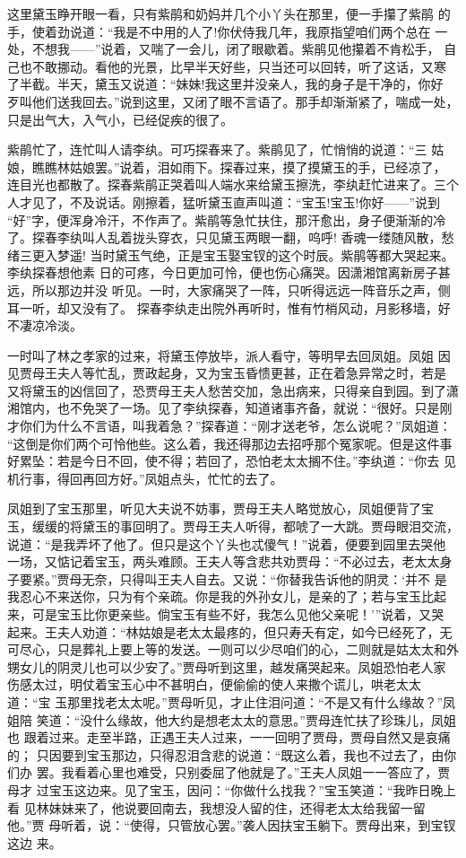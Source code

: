 这里黛玉睁开眼一看，只有紫鹃和奶妈并几个小丫头在那里，便一手攥了紫鹃
的手，使着劲说道：“我是不中用的人了!你伏侍我几年，我原指望咱们两个总在
一处，不想我——”说着，又喘了一会儿，闭了眼歇着。紫鹃见他攥着不肯松手，
自己也不敢挪动。看他的光景，比早半天好些，只当还可以回转，听了这话，又寒
了半截。半天，黛玉又说道：“妹妹!我这里并没亲人，我的身子是干净的，你好
歹叫他们送我回去。”说到这里，又闭了眼不言语了。那手却渐渐紧了，喘成一处，
只是出气大，入气小，已经促疾的很了。

紫鹃忙了，连忙叫人请李纨。可巧探春来了。紫鹃见了，忙悄悄的说道：“三
姑娘，瞧瞧林姑娘罢。”说着，泪如雨下。探春过来，摸了摸黛玉的手，已经凉了，
连目光也都散了。探春紫鹃正哭着叫人端水来给黛玉擦洗，李纨赶忙进来了。三个
人才见了，不及说话。刚擦着，猛听黛玉直声叫道：“宝玉!宝玉!你好——”说到
“好”字，便浑身冷汗，不作声了。紫鹃等急忙扶住，那汗愈出，身子便渐渐的冷
了。探春李纨叫人乱着拢头穿衣，只见黛玉两眼一翻，呜呼!
香魂一缕随风散，愁绪三更入梦遥!
当时黛玉气绝，正是宝玉娶宝钗的这个时辰。紫鹃等都大哭起来。李纨探春想他素
日的可疼，今日更加可怜，便也伤心痛哭。因潇湘馆离新房子甚远，所以那边并没
听见。一时，大家痛哭了一阵，只听得远远一阵音乐之声，侧耳一听，却又没有了。
探春李纨走出院外再听时，惟有竹梢风动，月影移墙，好不凄凉冷淡。

一时叫了林之孝家的过来，将黛玉停放毕，派人看守，等明早去回凤姐。凤姐
因见贾母王夫人等忙乱，贾政起身，又为宝玉昏愦更甚，正在着急异常之时，若是
又将黛玉的凶信回了，恐贾母王夫人愁苦交加，急出病来，只得亲自到园。到了潇
湘馆内，也不免哭了一场。见了李纨探春，知道诸事齐备，就说：“很好。只是刚
才你们为什么不言语，叫我着急？”探春道：“刚才送老爷，怎么说呢？”凤姐道：
“这倒是你们两个可怜他些。这么着，我还得那边去招呼那个冤家呢。但是这件事
好累坠：若是今日不回，使不得；若回了，恐怕老太太搁不住。”李纨道：“你去
见机行事，得回再回方好。”凤姐点头，忙忙的去了。

凤姐到了宝玉那里，听见大夫说不妨事，贾母王夫人略觉放心，凤姐便背了宝
玉，缓缓的将黛玉的事回明了。贾母王夫人听得，都唬了一大跳。贾母眼泪交流，
说道：“是我弄坏了他了。但只是这个丫头也忒傻气！”说着，便要到园里去哭他
一场，又惦记着宝玉，两头难顾。王夫人等含悲共劝贾母：“不必过去，老太太身
子要紧。”贾母无奈，只得叫王夫人自去。又说：“你替我告诉他的阴灵：‘并不
是我忍心不来送你，只为有个亲疏。你是我的外孙女儿，是亲的了；若与宝玉比起
来，可是宝玉比你更亲些。倘宝玉有些不好，我怎么见他父亲呢！’”说着，又哭
起来。王夫人劝道：“林姑娘是老太太最疼的，但只寿夭有定，如今已经死了，无
可尽心，只是葬礼上要上等的发送。一则可以少尽咱们的心，二则就是姑太太和外
甥女儿的阴灵儿也可以少安了。”贾母听到这里，越发痛哭起来。凤姐恐怕老人家
伤感太过，明仗着宝玉心中不甚明白，便偷偷的使人来撒个谎儿，哄老太太道：“宝
玉那里找老太太呢。”贾母听见，才止住泪问道：“不是又有什么缘故？”凤姐陪
笑道：“没什么缘故，他大约是想老太太的意思。”贾母连忙扶了珍珠儿，凤姐也
跟着过来。走至半路，正遇王夫人过来，一一回明了贾母，贾母自然又是哀痛的；
只因要到宝玉那边，只得忍泪含悲的说道：“既这么着，我也不过去了，由你们办
罢。我看着心里也难受，只别委屈了他就是了。”王夫人凤姐一一答应了，贾母才
过宝玉这边来。见了宝玉，因问：“你做什么找我？”宝玉笑道：“我昨日晚上看
见林妹妹来了，他说要回南去，我想没人留的住，还得老太太给我留一留他。”贾
母听着，说：“使得，只管放心罢。”袭人因扶宝玉躺下。贾母出来，到宝钗这边
来。

